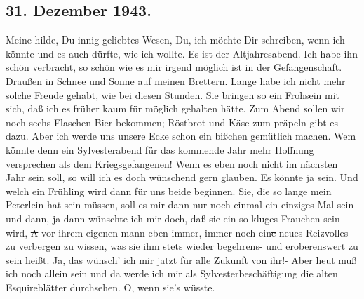 \subsection{31. Dezember 1943.}

Meine hilde, Du innig geliebtes Wesen, Du, ich m\"{o}chte Dir schreiben, wenn ich k\"{o}nnte und es auch d\"{u}rfte, wie ich wollte.
Es ist der Altjahresabend.
Ich habe ihn sch\"{o}n verbracht, so sch\"{o}n wie es mir irgend m\"{o}glich ist in der Gefangenschaft.
Drau{\ss}en in Schnee und Sonne auf meinen Brettern.
Lange habe ich nicht mehr solche Freude gehabt, wie bei diesen Stunden.
Sie bringen so ein Frohsein mit sich, da{\ss} ich es fr\"{u}her kaum f\"{u}r m\"{o}glich gehalten h\"{a}tte.
Zum Abend sollen wir noch sechs Flaschen Bier bekommen; R\"{o}stbrot und K\"{a}se zum pr\"{a}peln gibt es dazu.
Aber ich werde uns unsere Ecke schon ein bi{\ss}chen gem\"{u}tlich machen.
Wem k\"{o}nnte denn ein Sylvesterabend f\"{u}r das kommende Jahr mehr Hoffnung versprechen als dem Kriegsgefangenen!
Wenn es eben noch nicht im n\"{a}chsten Jahr sein soll, so will ich es doch w\"{u}nschend gern glauben.
Es k\"{o}nnte ja sein.
Und welch ein Fr\"{u}hling wird dann f\"{u}r uns beide beginnen.
Sie, die so lange mein Peterlein hat sein m\"{u}ssen, soll es mir dann nur noch einmal ein einziges Mal sein und dann, ja dann w\"{u}nschte ich mir doch, da{\ss} sie ein so kluges Frauchen sein wird, \st{A} vor ihrem eigenen mann eben immer, immer noch ein\st{e} neues Reizvolles zu verbergen \st{zu} wissen, was sie ihm stets wieder begehrens- und eroberenswert zu sein hei{\ss}t.
Ja, das w\"{u}nsch' ich mir jatzt f\"{u}r alle Zukunft von ihr!-
Aber heut mu{\ss} ich noch allein sein und da werde ich mir als Sylvesterbesch\"{a}ftigung die alten Esquirebl\"{a}tter durchsehen.
O, wenn sie's w\"{u}sste.

\clearpage
